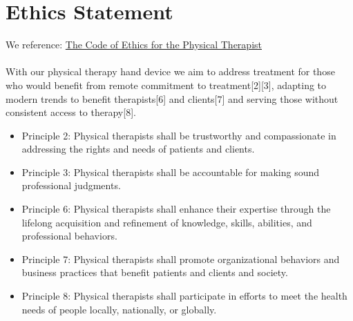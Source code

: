 \documentclass{article}
\begin{document}
\section{Ethics Statement}
We reference: \href{https://www.apta.org/siteassets/pdfs/policies/codeofethicshods06-20-28-25.pdf}{The Code of Ethics for the Physical Therapist} \\ \\ 
With our physical therapy hand device we aim to address treatment for those who would
benefit from remote commitment to treatment[2][3], adapting to modern trends to benefit
therapists[6] and clients[7] and serving those without consistent access to therapy[8].
\begin{itemize}
\item Principle 2: Physical therapists shall be trustworthy and compassionate in addressing the
rights and needs of patients and clients.
\item Principle 3: Physical therapists shall be accountable for making sound professional judgments.
\item Principle 6: Physical therapists shall enhance their expertise through the lifelong acquisition
and refinement of knowledge, skills, abilities, and professional behaviors.
\item Principle 7: Physical therapists shall promote organizational behaviors and business practices
that benefit patients and clients and society.
\item Principle 8: Physical therapists shall participate in efforts to meet the health needs of people locally, nationally, or globally.
\end{itemize}
\end{document}
